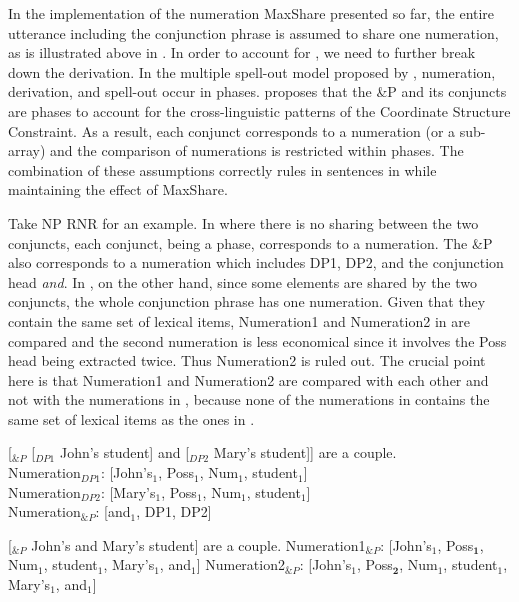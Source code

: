 \documentclass[output=paper]{langscibook}
\begin{document}
In the implementation of the numeration MaxShare presented so far, the entire utterance including the conjunction phrase is assumed to share one numeration, as is illustrated above in . In order to account for , we need to further break down the derivation. In the multiple spell-out model proposed by \cite{Uriagereka:1999a, Chomsky:2000} , numeration, derivation, and spell-out occur in phases. \cite{Oda:2017} proposes that the \&P and its conjuncts are phases to account for the cross-linguistic patterns of the Coordinate Structure Constraint. 
As a result, each conjunct corresponds to a numeration (or a sub-array) and the comparison of numerations is restricted within phases. The combination of these assumptions correctly rules in sentences in  while maintaining the effect of MaxShare. 

\largerpage[2]
Take NP RNR for an example. In  where there is no sharing between the two conjuncts, each conjunct, being a phase, corresponds to a numeration. The \&P also corresponds to a numeration which includes DP1, DP2, and the conjunction head \textit{and}.  In , on the other hand, since some elements are shared by the two conjuncts, the whole conjunction phrase has one numeration. Given that they contain the same set of lexical items, Numeration1 and Numeration2 in  are compared and the second numeration is less economical since it involves the Poss head being extracted twice. Thus Numeration2 is ruled out. The crucial point here is that Numeration1 and Numeration2 are compared with each other and not with the numerations in , because none of the numerations in  contains the same set of lexical items as the ones in . 

\ea 
\label{shenex22}
[$_{\&P}$ [$_{DP1}$ John's student] and [$_{DP2}$ Mary's student]] are a couple.\\
Numeration$_{DP1}$: [John's$_1$, Poss$_1$, Num$_1$, student$_1$]\\
Numeration$_{DP2}$: [Mary's$_1$, Poss$_1$, Num$_1$, student$_1$]\\
Numeration$_{\&P}$: [and$_1$, DP1, DP2]

\ex
\label{shenex23}
[$_{\&P}$ John's and Mary's student] are a couple.
\ea 
	Numeration1$_{\&P}$: [John's$_1$, Poss$_\textbf{1}$, Num$_1$, student$_1$, Mary's$_1$, and$_1$]
\ex 
	Numeration2$_{\&P}$: [John's$_1$, Poss$_\textbf{2}$, Num$_1$, student$_1$, Mary's$_1$, and$_1$]
\z 
\z 
\end{document}
